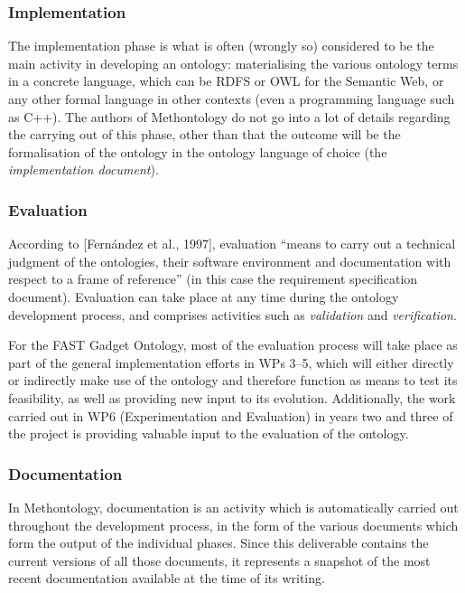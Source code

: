 \documentclass[twoside]{fast_latex}
\begin{document}
\subsubsection{Implementation} %
\label{ssub:implementation}

The implementation phase is what is often (wrongly so) considered to be the main activity in developing an ontology: materialising the various ontology terms in a concrete language, which can be RDFS or OWL for the Semantic Web, or any other formal language in other contexts (even a programming language such as C++). The authors of Methontology do not go into a lot of details regarding the carrying out of this phase, other than that the outcome will be the formalisation of the ontology in the ontology language of choice (the \emph{implementation document}).

\subsubsection{Evaluation} %
\label{ssub:evaluation}

According to [Fernández et  al., 1997], evaluation ``means to carry out a technical judgment of the ontologies, their software environment and documentation with respect to a frame of reference'' (in this case the requirement specification document). Evaluation can take place at any time during the ontology development process, and comprises activities such as \emph{validation} and \emph{verification}.

For the FAST Gadget Ontology, most of the evaluation process will take place as part of the general implementation efforts in WPs 3--5, which will either directly or indirectly make use of the ontology and therefore function as means to test its feasibility, as well as providing new input to its evolution. Additionally, the work carried out in WP6 (Experimentation and Evaluation) in years two and three of the project is providing valuable input to the evaluation of the ontology.

\subsubsection{Documentation} %
\label{ssub:documentation}

In Methontology, documentation is an activity which is automatically carried out throughout the development process, in the form of the various documents which form the output of the individual phases. Since this deliverable contains the current versions of all those documents, it represents a snapshot of the most recent documentation available at the time of its writing.
\end{document}
